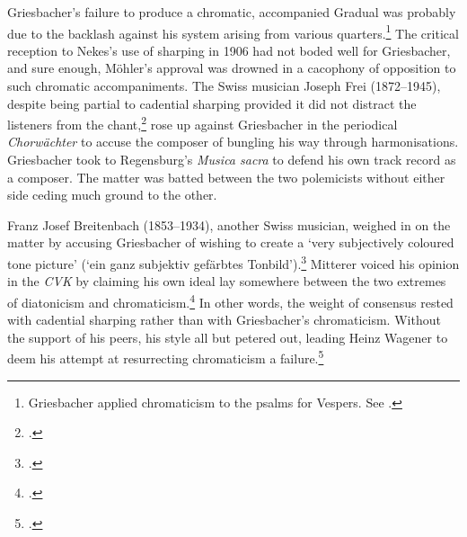 Griesbacher's failure to produce a chromatic, accompanied Gradual was probably due to the backlash against his system arising from various quarters.\footnote{Griesbacher applied chromaticism to the psalms for Vespers. See \covid{}\cite{GriesbacherPsalteriumvespertinumTonos1913}.}
The critical reception to Nekes's use of sharping in 1906 had not boded well for Griesbacher, and sure enough, Möhler's approval was drowned in a cacophony of opposition to such chromatic accompaniments.
The Swiss musician Joseph Frei (1872--1945), despite being partial to cadential sharping provided it did not distract the listeners from the chant,\footcite[251]{FreiChoralundChroma1912} rose up against Griesbacher in the periodical \covid{}\emph{Chorwächter} to accuse the composer of bungling his way through harmonisations.
Griesbacher took to Regensburg's \emph{Musica sacra} to defend his own track record as a composer.
The matter was batted between the two polemicists without either side ceding much ground to the other.

\pagebreak{}
Franz Josef Breitenbach (1853--1934), another Swiss musician, weighed in on the matter by accusing Griesbacher of wishing to create a `very subjectively coloured tone picture' (`ein ganz subjektiv gefärbtes Tonbild').\footcite[249]{BreitenbachChoralundChroma1912}
Mitterer voiced his opinion in the \emph{CVK} by claiming his own ideal lay somewhere between the two extremes of diatonicism and chromaticism.\footnote{.}
In other words, the weight of consensus rested with cadential sharping rather than with Griesbacher's chromaticism.
Without the support of his peers, his style all but petered out, leading Heinz Wagener to deem his attempt at resurrecting chromaticism a failure.\footcite[100]{WagenerBegleitunggregorianischenChorals1964}

